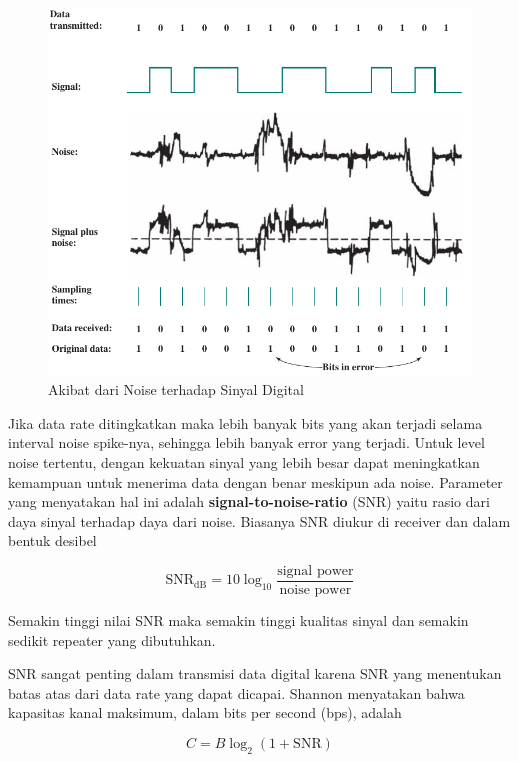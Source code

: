 \begin{figure}
	\centering
	\includegraphics[width=\linewidth]{gambar/3.4.gambar.3.15.akibat_noise_pada_sinyal_digital}
	\caption{Akibat dari Noise terhadap Sinyal Digital}
	\label{fig.aklibat_noise}
\end{figure}

Jika data rate ditingkatkan maka lebih banyak bits yang akan terjadi selama interval noise spike-nya, sehingga lebih banyak error yang terjadi. Untuk level noise tertentu, dengan kekuatan sinyal yang lebih besar dapat meningkatkan kemampuan untuk menerima data dengan benar meskipun ada noise. Parameter yang menyatakan hal ini adalah \textbf{signal-to-noise-ratio} (SNR) yaitu rasio dari daya sinyal terhadap daya dari noise. Biasanya SNR diukur di receiver dan dalam bentuk desibel

\begin{equation}
	\text{SNR}_{\text{dB}} = 10 \log_{10} \frac{\text{signal power}}{\text{noise power}}
\end{equation}

Semakin tinggi nilai SNR maka semakin tinggi kualitas sinyal dan semakin sedikit repeater yang dibutuhkan.

SNR sangat penting dalam transmisi data digital karena SNR yang menentukan batas atas dari data rate yang dapat dicapai. Shannon menyatakan bahwa kapasitas kanal maksimum, dalam bits per second (bps), adalah

\begin{equation} \label{per.shannon}
	C = B \log_2 (1+\text{SNR})
\end{equation}


